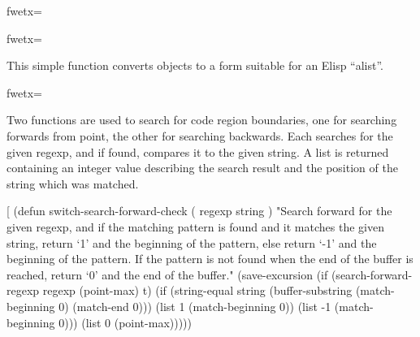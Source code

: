 {\fwbeginmacro
{}\fwplusequals \fwodef {}fwetx=%
\fwcdef 
\fwbeginmacronotes
{}
\fwendmacronotes
\fwendmacro


\fwbeginmacro
{}\fwplusequals \fwodef {}fwetx=%
\fwcdef 
\fwbeginmacronotes
{}
\fwendmacronotes
\fwendmacro


This simple function converts objects to a form suitable for an Elisp
``alist''.

\fwbeginmacro
{}\fwplusequals \fwodef {}fwetx=%
\fwcdef 
\fwbeginmacronotes
{}
\fwendmacronotes
\fwendmacro


Two functions are used to search for code region boundaries, one for
searching forwards from point, the other for searching backwards.
Each searches for the given regexp, and if found, compares it to the
given string.  A list is returned containing an integer value
describing the search result and the position of the string which was
matched.

\fwbeginmacro
{}\fwplusequals \fwodef \fwbtx[
(defun switch-search-forward-check ( regexp string )
  "Search forward for the given regexp, and if the matching
pattern is found and it matches the given string, return `1'
and the beginning of the pattern, else return `-1' and the
beginning of the pattern.  If the pattern is not found when
the end of the buffer is reached, return `0' and the end of
the buffer."
  (save-excursion
    (if (search-forward-regexp regexp (point-max) t)
        (if (string-equal
             string
             (buffer-substring
              (match-beginning 0)
              (match-end 0)))
            (list 1 (match-beginning 0))
          (list -1 (match-beginning 0)))
      (list 0 (point-max)))))

}
